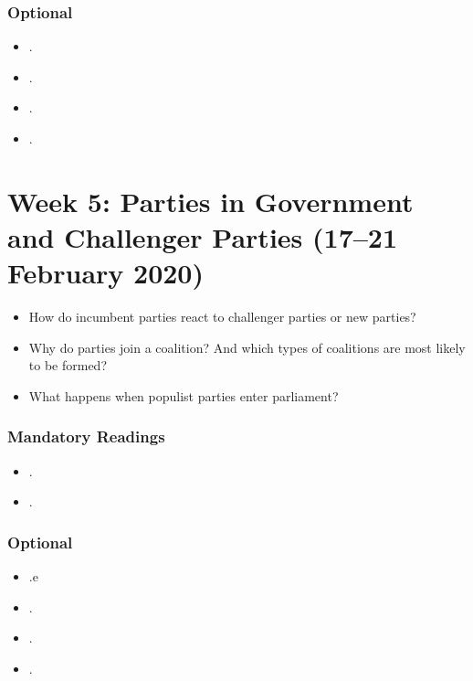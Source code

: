 \documentclass[abstract=on,parskip=full,headings=standardclasses,fontsize=11pt,paper=a4]{scrartcl}
\begin{document}
\subsubsection*{Optional}
\begin{itemize}
\item {}.
\item {}.
\item {}.
\item {}.
\end{itemize}



\section{Week 5: Parties in Government and Challenger Parties  (17--21 February 2020)}

\begin{itemize}
\renewcommand\labelitemi{--}
\item How do incumbent parties react to challenger parties or new parties?
\item Why do parties join a coalition? And which types of coalitions are most likely to be formed?
\item What happens when populist parties enter parliament?
\end{itemize}

\subsubsection*{Mandatory Readings}
\begin{itemize}
\item {}.
\item {}.
\end{itemize}


\subsubsection*{Optional}
\begin{itemize}
\item {}.e
\item {}.
\item {}.
\item {}.
\end{itemize}
\end{document}
